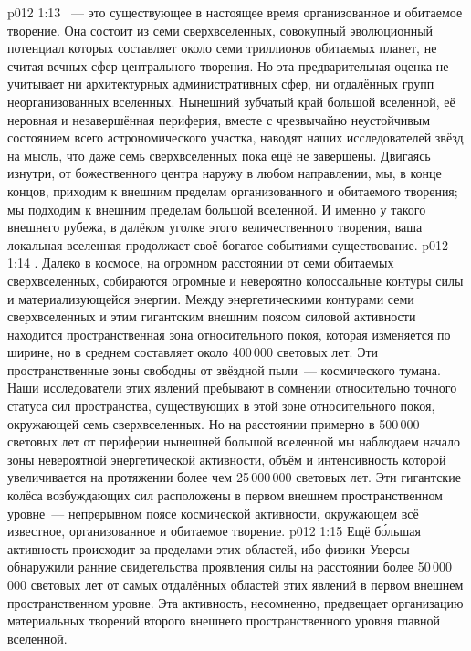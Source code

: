 \vs p012 1:13 ~--- это существующее в настоящее время организованное и обитаемое творение. Она состоит из семи сверхвселенных, совокупный эволюционный потенциал которых составляет около семи триллионов обитаемых планет, не считая вечных сфер центрального творения. Но эта предварительная оценка не учитывает ни архитектурных административных сфер, ни отдалённых групп неорганизованных вселенных. Нынешний зубчатый край большой вселенной, её неровная и незавершённая периферия, вместе с чрезвычайно неустойчивым состоянием всего астрономического участка, наводят наших исследователей звёзд на мысль, что даже семь сверхвселенных пока ещё не завершены. Двигаясь изнутри, от божественного центра наружу в любом направлении, мы, в конце концов, приходим к внешним пределам организованного и обитаемого творения; мы подходим к внешним пределам большой вселенной. И именно у такого внешнего рубежа, в далёком уголке этого величественного творения, ваша локальная вселенная продолжает своё богатое событиями существование.
\vs p012 1:14 . Далеко в космосе, на огромном расстоянии от семи обитаемых сверхвселенных, собираются огромные и невероятно колоссальные контуры силы и материализующейся энергии. Между энергетическими контурами семи сверхвселенных и этим гигантским внешним поясом силовой активности находится пространственная зона относительного покоя, которая изменяется по ширине, но в среднем составляет около 400\,000 световых лет. Эти пространственные зоны свободны от звёздной пыли~--- космического тумана. Наши исследователи этих явлений пребывают в сомнении относительно точного статуса сил пространства, существующих в этой зоне относительного покоя, окружающей семь сверхвселенных. Но на расстоянии примерно в 500\,000 световых лет от периферии нынешней большой вселенной мы наблюдаем начало зоны невероятной энергетической активности, объём и интенсивность которой увеличивается на протяжении более чем 25\,000\,000 световых лет. Эти гигантские колёса возбуждающих сил расположены в первом внешнем пространственном уровне~--- непрерывном поясе космической активности, окружающем всё известное, организованное и обитаемое творение.
\vs p012 1:15 Ещё б\'ольшая активность происходит за пределами этих областей, ибо физики Уверсы обнаружили ранние свидетельства проявления силы на расстоянии более 50\,000\,000 световых лет от самых отдалённых областей этих явлений в первом внешнем пространственном уровне. Эта активность, несомненно, предвещает организацию материальных творений второго внешнего пространственного уровня главной вселенной.
